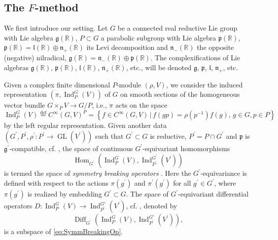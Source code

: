 \documentclass[a4paper,12pt,reqno]{amsart}
\numberwithin{theorem}{subsection}
\numberwithin{equation}{section}
\begin{document}
\subsection{The $F$-method}\label{F-method}

We first introduce our setting. Let $G$ be a connected real reductive Lie group
with Lie algebra ${{\mathfrak g}}({\mathbb{R}})$, $P\subset G$ a parabolic subgroup with Lie algebra
${{\mathfrak p}}({\mathbb{R}})$, ${{\mathfrak p}}({\mathbb{R}}) = {{\mathfrak l}}({\mathbb{R}}) \oplus {{\mathfrak n}}_+({\mathbb{R}})$ its Levi decomposition and
${{\mathfrak n}}_-({\mathbb{R}})$ the opposite (negative) nilradical,
${{\mathfrak g}}({\mathbb{R}})={{\mathfrak n}}_-({\mathbb{R}})\oplus{{\mathfrak p}}({\mathbb{R}})$. The complexifications of Lie algebras
${{\mathfrak g}}({\mathbb{R}})$, ${{\mathfrak p}}({\mathbb{R}})$, ${{\mathfrak l}}({\mathbb{R}})$, ${{\mathfrak n}}_+({\mathbb{R}})$, etc., will be denoted ${{\mathfrak g}}$,
${{\mathfrak p}}$, ${{\mathfrak l}}$, ${{\mathfrak n}}_+$, etc.

Given a complex finite dimensional $P$-module $(\rho,V)$, we consider the
induced representation $\left(\pi,{\operatorname{Ind}}_{P}^{G}(V)\right)$ of $G$ on smooth
sections of the homogeneous vector bundle $G \times_{P}V \to G/P$, i.e., $\pi$
acts on the space
\begin{equation*}
   {\operatorname{Ind}}_{P}^{G}(V) {\stackrel{\text{def}}{=}} C^\infty(G,V)^{P}=\left\{f\in C^\infty(G,V) \,|\, f(g p) =
   \rho(p^{-1}) f(g),\, g\in  G,p\in  P\right\}
\end{equation*}
by the left regular representation. Given another data $(G^\prime,
P^\prime,\rho^\prime:P^\prime\to {\operatorname{GL}}(V^\prime))$ such that $G^\prime\subset G$
is reductive, $P^\prime=P\cap G^\prime$ and ${{\mathfrak p}}$ is ${{\mathfrak g}}^\prime$-compatible,
cf. \cite[Definition $4.5$]{Kobayashi-Pevzner}, the space of continuous
$G^\prime$-equivariant homomorphisms
\begin{equation}\label{eq:SymmBreakingOp}
   {\operatorname{Hom}}_{G^\prime}\left({\operatorname{Ind}}^{G}_{P}(V),{\operatorname{Ind}}^{G^\prime}_{P^\prime}(V^\prime)\right)
\end{equation}
is termed the space of {\it symmetry breaking operators} \cite{kobayashi-speh}.
Here the $G^\prime$-equivariance is defined with respect to the actions
$\pi(g^\prime)$ and $\pi^\prime(g^\prime)$ for all $g^\prime\in G^\prime$,
where $\pi(g^\prime)$ is realized by embedding $G^\prime\subset G$. The space
of $G^\prime$-equivariant differential operators $D:{\operatorname{Ind}}^{G}_{P}(V)\to
{\operatorname{Ind}}^{G\prime}_{P^\prime}(V^\prime)$, cf. \cite[Section 2]{Kobayashi-Pevzner},
denoted by
\begin{equation}\label{eq:DiffSymmBreakingOp}
   {\operatorname{Diff}}_{G^\prime} \left({\operatorname{Ind}}^{G}_{P}(V),{\operatorname{Ind}}^{G\prime}_{P^\prime}(V^\prime)\right),
\end{equation}
is a subspace of \eqref{eq:SymmBreakingOp}.
\end{document}
